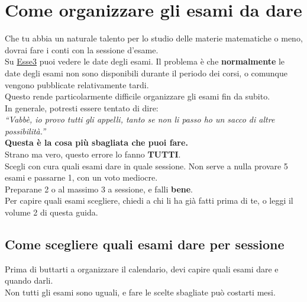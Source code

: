 \documentclass[18pt]{extarticle}
\begin{document}
\section{Come organizzare gli esami da dare}
Che tu abbia un naturale talento per lo studio delle materie matematiche o meno, dovrai fare i conti con la sessione d'esame.\\
Su \href{https://uniud.esse3.cineca.it/Home.do}{Esse3} puoi vedere le date degli esami. Il problema è che \textbf{normalmente} le date degli esami non sono disponibili durante il periodo dei corsi, o comunque vengono pubblicate relativamente tardi.\\
Questo rende particolarmente difficile organizzare gli esami fin da subito.\\
In generale, potresti essere tentato di dire:\\
\textit{``Vabbè, io provo tutti gli appelli, tanto se non li passo ho un sacco di altre possibilità.''}\\
\textbf{Questa è la cosa più sbagliata che puoi fare.}\\
Strano ma vero, questo errore lo fanno \textbf{TUTTI}.\\
Scegli con cura quali esami dare in quale sessione. Non serve a nulla provare 5 esami e passarne 1, con un voto mediocre.\\
Preparane 2 o al massimo 3 a sessione, e falli \textbf{bene}.\\
Per capire quali esami scegliere, chiedi a chi li ha già fatti prima di te, o leggi il volume 2 di questa guida.


\subsection{Come scegliere quali esami dare per sessione}
Prima di buttarti a organizzare il calendario, devi capire quali esami dare e quando darli.\\
Non tutti gli esami sono uguali, e fare le scelte sbagliate può costarti mesi.
\end{document}
